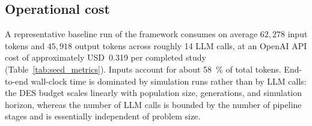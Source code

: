 \documentclass[a4paper,fleqn]{cas-sc}
\begin{document}
                                                                                                                                        








  \subsection{Operational cost}\label{sec:results-cost}                                                                 
  
  A representative baseline run of the framework consumes on average $62{,}278$ input tokens and $45{,}918$ output      
  tokens across roughly 14 LLM calls, at an OpenAI API cost of approximately USD~0.319 per completed study
  (Table~\ref{tab:seed_metrics}). Inputs account for about 58~\% of total tokens. End-to-end wall-clock time is         
  dominated by simulation runs rather than by LLM calls: the DES budget scales linearly with population size,
  generations, and simulation horizon, whereas the number of LLM calls is bounded by the number of pipeline stages and
  is essentially independent of problem size.
\end{document}
